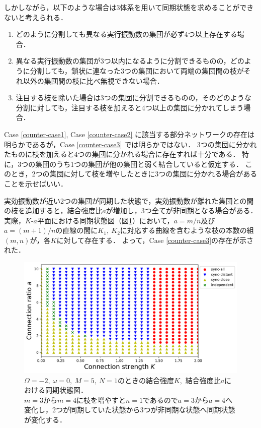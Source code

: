 \documentclass[../main]{subfiles}
\begin{document}
しかしながら，以下のような場合は3体系を用いて同期状態を求めることができないと考えられる．
\renewcommand{\labelenumi}{Case \theenumi}
\begin{enumerate}
    \item \label{counter-case1} 
    どのように分割しても異なる実行振動数の集団が必ず4つ以上存在する場合．
    \item \label{counter-case2}
    異なる実行振動数の集団が3つ以内になるように分割できるものの，どのように分割しても，鎖状に連なった3つの集団において両端の集団間の枝がそれ以外の集団間の枝に比べ無視できない場合．
    \item \label{counter-case3}
    注目する枝を除いた場合は3つの集団に分割できるものの，そのどのような分割に対しても，注目する枝を加えると4つ以上の集団に分かれてしまう場合．
\end{enumerate}

Case \ref{counter-case1}, Case \ref{counter-case2} に該当する部分ネットワークの存在は明らかであるが，Case \ref{counter-case3} では明らかではない．
3つの集団に分かれたものに枝を加えると4つの集団に分かれる場合に存在すれば十分である．
特に，3つの集団のうち1つの集団が他の集団と弱く結合していると仮定する．
このとき，2つの集団に対して枝を増やしたときに3つの集団に分かれる場合があることを示せばいい．

実効振動数が近い2つの集団が同期した状態で，実効振動数が離れた集団との間の枝を追加すると，結合強度比$a$が増加し，3つ全てが非同期となる場合がある．
実際，$K$-$a$平面における同期状態図（図\ref{fig:3body-phase-m5}）において，$a=m/n$及び$a=(m+1)/n$の直線の間に$K_1,\ K_2$に対応する曲線を含むような枝の本数の組$(m,n)$が，各$K$に対して存在する．
よって，Case \ref{counter-case3}の存在が示された．

\begin{figure}[tbp]
    \centering
    \includegraphics[width=135mm]{./images/three-body-phase-m5.pdf}
    \centering
    \caption{$\Omega=-2,\ \omega=0,\ M=5,\ N=1$のときの結合強度$K$,\ 結合強度比$a$における同期状態図．\\
    $m=3$から$m=4$に枝を増やすと$n=1$であるので$a=3$から$a=4$へ変化し，2つが同期していた状態から3つが非同期な状態へ同期状態が変化する．}
    \label{fig:3body-phase-m5}
\end{figure}
\end{document}
